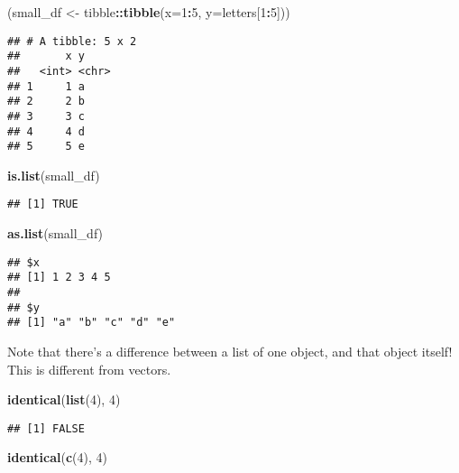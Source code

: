 \documentclass[]{article}
\newenvironment{Shaded}{\begin{snugshade}}{\end{snugshade}}
\newcommand{\KeywordTok}[1]{\textcolor[rgb]{0.13,0.29,0.53}{\textbf{#1}}}
\newcommand{\DataTypeTok}[1]{\textcolor[rgb]{0.13,0.29,0.53}{#1}}
\newcommand{\DecValTok}[1]{\textcolor[rgb]{0.00,0.00,0.81}{#1}}
\newcommand{\StringTok}[1]{\textcolor[rgb]{0.31,0.60,0.02}{#1}}
\newcommand{\OperatorTok}[1]{\textcolor[rgb]{0.81,0.36,0.00}{\textbf{#1}}}
\newcommand{\NormalTok}[1]{#1}
\begin{document}
\begin{Shaded}
\begin{Highlighting}[]
\NormalTok{(small_df <-}\StringTok{ }\NormalTok{tibble}\OperatorTok{::}\KeywordTok{tibble}\NormalTok{(}\DataTypeTok{x=}\DecValTok{1}\OperatorTok{:}\DecValTok{5}\NormalTok{, }\DataTypeTok{y=}\NormalTok{letters[}\DecValTok{1}\OperatorTok{:}\DecValTok{5}\NormalTok{]))}
\end{Highlighting}
\end{Shaded}

\begin{verbatim}
## # A tibble: 5 x 2
##       x y    
##   <int> <chr>
## 1     1 a    
## 2     2 b    
## 3     3 c    
## 4     4 d    
## 5     5 e
\end{verbatim}

\begin{Shaded}
\begin{Highlighting}[]
\KeywordTok{is.list}\NormalTok{(small_df)}
\end{Highlighting}
\end{Shaded}

\begin{verbatim}
## [1] TRUE
\end{verbatim}

\begin{Shaded}
\begin{Highlighting}[]
\KeywordTok{as.list}\NormalTok{(small_df)}
\end{Highlighting}
\end{Shaded}

\begin{verbatim}
## $x
## [1] 1 2 3 4 5
## 
## $y
## [1] "a" "b" "c" "d" "e"
\end{verbatim}

Note that there's a difference between a list of one object, and that
object itself! This is different from vectors.

\begin{Shaded}
\begin{Highlighting}[]
\KeywordTok{identical}\NormalTok{(}\KeywordTok{list}\NormalTok{(}\DecValTok{4}\NormalTok{), }\DecValTok{4}\NormalTok{)}
\end{Highlighting}
\end{Shaded}

\begin{verbatim}
## [1] FALSE
\end{verbatim}

\begin{Shaded}
\begin{Highlighting}[]
\KeywordTok{identical}\NormalTok{(}\KeywordTok{c}\NormalTok{(}\DecValTok{4}\NormalTok{), }\DecValTok{4}\NormalTok{)}
\end{Highlighting}
\end{Shaded}
\end{document}
